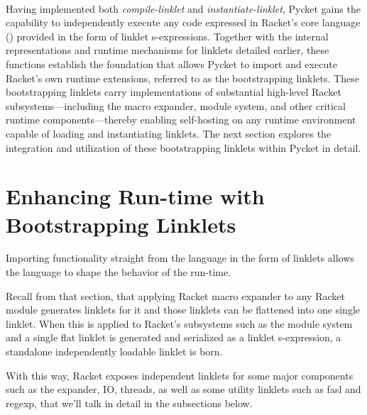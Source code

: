 		\paragraph{}%
			Having implemented both \emph{compile-linklet} and \emph{instantiate-linklet}, Pycket gains the capability to independently execute any code expressed in Racket's core language () provided in the form of linklet s-expressions. Together with the internal representations and runtime mechanisms for linklets detailed earlier, these functions establish the foundation that allows Pycket to import and execute Racket’s own runtime extensions, referred to as the bootstrapping linklets. These bootstrapping linklets carry implementations of substantial high-level Racket subsystems—including the macro expander, module system, and other critical runtime components—thereby enabling self-hosting on any runtime environment capable of loading and instantiating linklets. The next section explores the integration and utilization of these bootstrapping linklets within Pycket in detail.

	\section[\texorpdfstring{Enhancing Run-time with Bootstrapping Linklets}{Bootstrapping Linklets}]{Enhancing Run-time with Bootstrapping Linklets}
		\begin{mainpoint}
			Importing functionality straight from the language in the form of linklets allows the language to shape the behavior of the run-time.
		\end{mainpoint}

		\begin{paragraph-here}%
			Recall from that section, that applying Racket macro expander to any Racket module generates linklets for it and those linklets can be flattened into one single linklet. When this is applied to Racket's subsystems such as the module system and a single flat linklet is generated and serialized as a linklet s-expression, a standalone independently loadable linklet is born.
		\end{paragraph-here}

		\begin{paragraph-here}%
			With this way, Racket exposes independent linklets for some major components such as the expander, IO, threads, as well as some utility linklets such as fasl and regexp, that we'll talk in detail in the subsections below.
		\end{paragraph-here}

